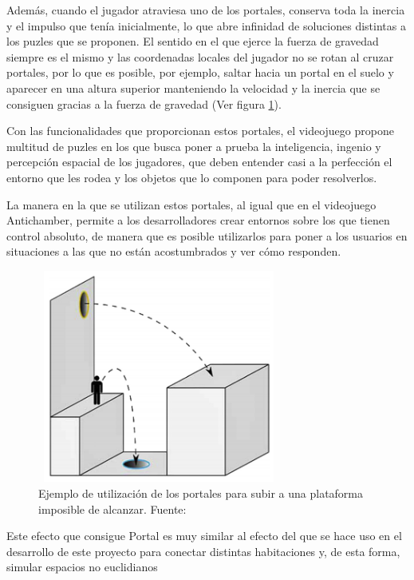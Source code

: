 \documentclass[../main.tex]{subfiles}
\begin{document}
Además, cuando el jugador atraviesa uno de los portales, conserva toda la inercia y el impulso que tenía inicialmente, lo que abre infinidad de soluciones distintas a los puzles que se proponen. El sentido en el que ejerce la fuerza de gravedad siempre es el mismo y las coordenadas locales del jugador no se rotan al cruzar portales, por lo que es posible, por ejemplo, saltar hacia un portal en el suelo y aparecer en una altura superior manteniendo la velocidad y la inercia que se consiguen gracias a la fuerza de gravedad (Ver figura \ref{fig:Portal_Game_2D}).

Con las funcionalidades que proporcionan estos portales, el videojuego propone multitud de puzles en los que busca poner a prueba la inteligencia, ingenio y percepción espacial de los jugadores, que deben entender casi a la perfección el entorno que les rodea y los objetos que lo componen para poder resolverlos.

La manera en la que se utilizan estos portales, al igual que en  el videojuego Antichamber, permite a los desarrolladores crear entornos sobre los que tienen control absoluto, de manera que es posible utilizarlos para poner a los usuarios en situaciones a las que no están acostumbrados y ver cómo responden.

\begin{figure}[htbp]
\centering
\includegraphics[width= 8cm, height= 7cm]{imagenes/Portal_Game_2D.png}
\caption{Ejemplo de utilización de los portales para subir a una plataforma imposible de alcanzar. Fuente:\cite{Portal_Game_2D}}
\label{fig:Portal_Game_2D}
\end{figure}

Este efecto que consigue Portal es muy similar al efecto del que se hace uso en el desarrollo de este proyecto para conectar distintas habitaciones y, de esta forma, simular espacios no euclidianos
\end{document}
